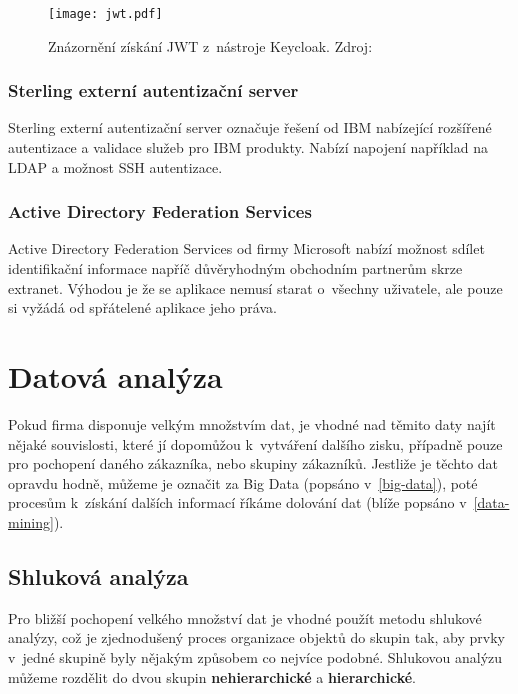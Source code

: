\begin{figure}[htp]
\centering
\texttt{[image: jwt.pdf]}
\caption[Znázornění získání JWT z~nástroje Keycloak]{Znázornění získání JWT z~nástroje Keycloak. Zdroj:  \cite{keycloak}}
\label{keycloak-jwt-fig}
\end{figure}
\newpage
\subsubsection{Sterling externí autentizační server}
\par Sterling externí autentizační server označuje řešení od IBM nabízející rozšířené autentizace a validace služeb pro IBM produkty. Nabízí napojení například na LDAP a možnost SSH autentizace. \cite{ibm-ster}

\subsubsection{Active Directory Federation Services}
\par Active Directory Federation Services od firmy Microsoft nabízí možnost sdílet identifikační informace napříč důvěryhodným obchodním partnerům skrze extranet. Výhodou je že se aplikace nemusí starat o~všechny uživatele, ale pouze si vyžádá od spřátelené aplikace jeho práva. \cite{ADFS}

\section{Datová analýza}
\par Pokud firma disponuje velkým množstvím dat, je vhodné nad těmito daty najít nějaké souvislosti, které jí dopomůžou k~vytváření dalšího zisku, případně pouze pro pochopení daného zákazníka, nebo skupiny zákazníků. Jestliže je těchto dat opravdu hodně, můžeme je označit za Big Data (popsáno v~\ref{big-data}), poté procesům k~získání dalších informací říkáme dolování dat (blíže popsáno v~\ref{data-mining}).

\subsection{Shluková analýza}
\par Pro bližší pochopení velkého množství dat je vhodné použít metodu shlukové analýzy, což je zjednodušený proces organizace objektů do skupin tak, aby prvky v~jedné skupině byly nějakým způsobem co nejvíce podobné. Shlukovou analýzu můžeme rozdělit do dvou skupin \textbf{nehierarchické} a \textbf{hierarchické}.

